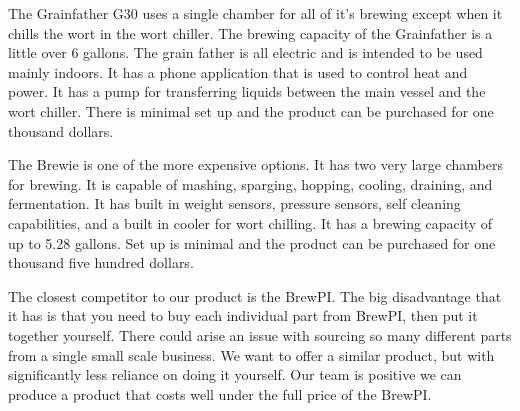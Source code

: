 The Grainfather G30 uses a single chamber for all of it's brewing except when it
chills the wort in the wort chiller. The brewing capacity of the Grainfather is
a little over 6 gallons. The grain father is all electric and is
intended to be used mainly indoors. \cite{AllGrain_2021} It has a phone application that is used to
control heat and power. It has a pump for transferring liquids between the main
vessel and the wort chiller. There is minimal set up and the product can be
purchased for one thousand dollars. \cite{Grainfather_2019} 
        
The Brewie is one of the more expensive options. It has two very large chambers
for brewing. It is capable of mashing, sparging, hopping, cooling, draining, and
fermentation. It has built in weight sensors, pressure sensors, self cleaning
capabilities, and a built in cooler for wort chilling. It has a brewing capacity
of up to 5.28 gallons. Set up is minimal and the product can be purchased for
one thousand five hundred dollars. \cite{MoreBeer_2020}

The closest competitor to our product is the BrewPI. The big disadvantage
that it has is that you need to buy each individual part from BrewPI, then put it
together yourself. There could arise an issue with sourcing so many different parts from
a single small scale business. We want to offer a similar product, but with
significantly less reliance on doing it yourself. Our team is positive we can
produce a product that costs well under the full price of the BrewPI. 
